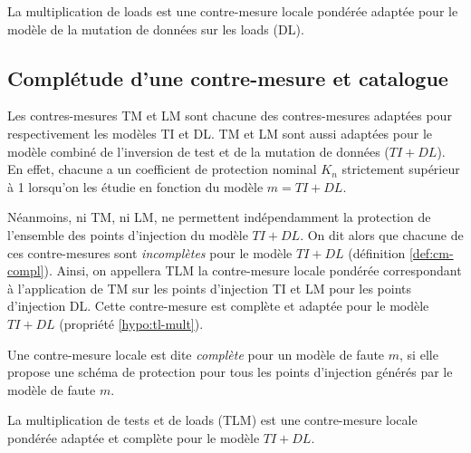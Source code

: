                 \begin{proper}
                    \label{hypo:load-mult}
                    La multiplication de loads est une contre-mesure locale pondérée adaptée pour le modèle de la mutation de données sur les loads (\gls{DL}).
                \end{proper}
                
        \subsection{Complétude d'une contre-mesure et catalogue}
        \label{sec:cm-complete}
         
            Les contres-mesures \gls{TM} et \gls{LM} sont chacune des contres-mesures adaptées pour respectivement les modèles \gls{TI} et \gls{DL}. 
            \gls{TM} et \gls{LM} sont aussi adaptées pour le modèle combiné de l'inversion de test et de la mutation de données ($TI+DL$).
            En effet, chacune a un coefficient de protection nominal $K_n$ strictement supérieur à 1 lorsqu'on les étudie en fonction du modèle $m = TI+DL$.
            
            Néanmoins, ni \gls{TM}, ni \gls{LM}, ne permettent indépendamment la protection de l'ensemble des points d'injection du modèle $TI+DL$. On dit alors que chacune de ces contre-mesures sont \textit{incomplètes} pour le modèle $TI+DL$ (définition \ref{def:cm-compl}).
            Ainsi, on appellera \gls{TLM} la contre-mesure locale pondérée correspondant à l'application de \gls{TM} sur les points d'injection \gls{TI} et \gls{LM} pour les points d'injection \gls{DL}. Cette contre-mesure est complète et adaptée pour le modèle $TI+DL$ (propriété \ref{hypo:tl-mult}).
            
            \begin{defi}
                \label{def:cm-compl}
                Une contre-mesure locale est dite \textit{complète} pour un modèle de faute $m$, si elle propose une schéma de protection pour tous les points d'injection générés par le modèle de faute $m$.
            \end{defi}
        
            \begin{proper}
                \label{hypo:tl-mult}
                La multiplication de tests et de loads (\gls{TLM}) est une contre-mesure locale pondérée adaptée et complète pour le modèle $TI+DL$.
            \end{proper}

